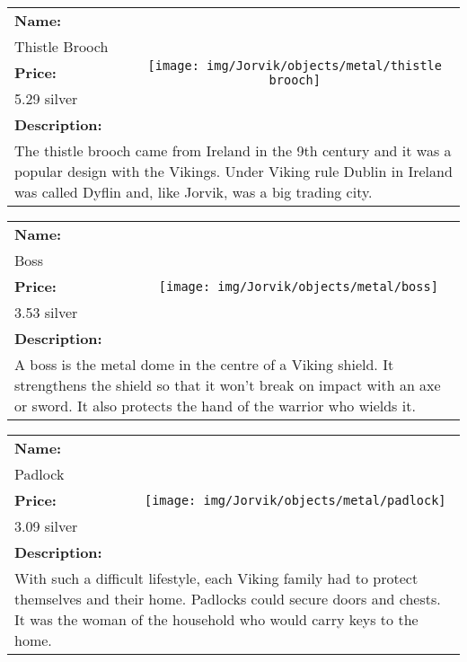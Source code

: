 \begin{table}[ht!]
	\centering
	\begin{tabular}{ p{3cm} c }\toprule
		\textbf{Name:} & \multirow{5}{*}{\texttt{[image: img/Jorvik/objects/metal/thistle brooch]}}\\
		Thistle Brooch & \\ 
		\textbf{Price:} & \\
		5.29 silver & \\ 
		\textbf{Description:} & \\
		\multicolumn{2}{p{12cm}}{The thistle brooch came from Ireland in the 9th century and it was a popular design with the Vikings. Under Viking rule Dublin in Ireland was called Dyflin and, like Jorvik, was a big trading city.}\\
		\bottomrule
	\end{tabular}
\end{table}

\begin{table}[ht!]
	\centering
	\begin{tabular}{ p{3cm} c }\toprule
		\textbf{Name:} & \multirow{5}{*}{\texttt{[image: img/Jorvik/objects/metal/boss]}}\\
		Boss & \\ 
		\textbf{Price:} & \\
		3.53 silver & \\ 
		\textbf{Description:} & \\
		\multicolumn{2}{p{12cm}}{A boss is the metal dome in the centre of a Viking shield. It strengthens the shield so that it won't break on impact with an axe or sword. It also protects the hand of the warrior who wields it.}\\
		\bottomrule
	\end{tabular}
\end{table}

\begin{table}[ht!]
	\centering
	\begin{tabular}{ p{3cm} c }\toprule
		\textbf{Name:} & \multirow{5}{*}{\texttt{[image: img/Jorvik/objects/metal/padlock]}}\\
		Padlock & \\ 
		\textbf{Price:} & \\
		3.09 silver & \\ 
		\textbf{Description:} & \\
		\multicolumn{2}{p{12cm}}{With such a difficult lifestyle, each Viking family had to protect themselves and their home. Padlocks could secure doors and chests. It was the woman of the household who would carry keys to the home.}\\
		\bottomrule
	\end{tabular}
\end{table}

